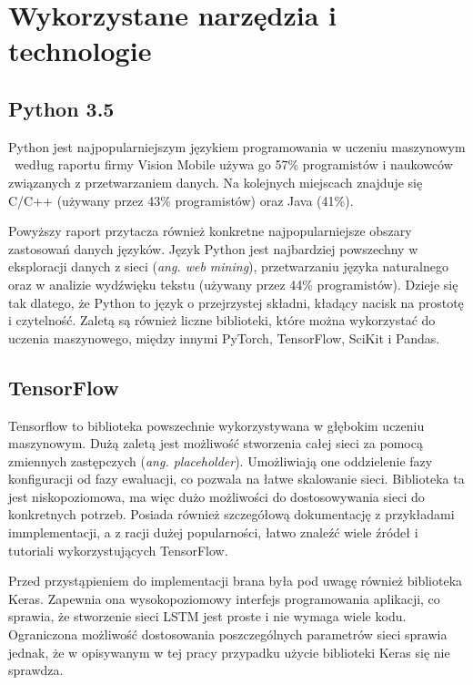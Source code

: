 \chapter{Wykorzystane narzędzia i technologie}
\label{cha:technologie}

\section{Python 3.5}
\label{sec:python}
Python jest najpopularniejszym językiem programowania w uczeniu maszynowym \textendash \ według raportu firmy Vision Mobile\cite{visionmobile} używa go 57\% programistów i naukowców związanych z przetwarzaniem danych. Na kolejnych miejscach znajduje się C/C++ (używany przez 43\% programistów) oraz Java (41\%). 

Powyższy raport przytacza również konkretne najpopularniejsze obszary zastosowań danych języków. Język Python jest najbardziej powszechny w eksploracji danych z sieci (\textit{ang. web mining}), przetwarzaniu języka naturalnego oraz w analizie wydźwięku tekstu (używany przez 44\% programistów). Dzieje się tak dlatego, że Python to język o przejrzystej składni, kładący nacisk na prostotę i czytelność\cite{python}. Zaletą są również liczne biblioteki, które można wykorzystać do uczenia maszynowego, między innymi PyTorch, TensorFlow, SciKit i Pandas.

\section{TensorFlow}
\label{sec:tensorflow}

Tensorflow to biblioteka powszechnie wykorzystywana w głębokim uczeniu maszynowym. Dużą zaletą jest możliwość stworzenia całej sieci za pomocą zmiennych zastępczych (\textit{ang. placeholder}). Umożliwiają one oddzielenie fazy konfiguracji od fazy ewaluacji, co pozwala na łatwe skalowanie sieci. Biblioteka ta jest niskopoziomowa, ma więc dużo możliwości do dostosowywania sieci do konkretnych potrzeb. 
Posiada również szczegółową dokumentację z przykładami immplementacji\cite{tensorflow}, a z racji dużej popularności, łatwo znaleźć wiele źródeł i tutoriali wykorzystujących TensorFlow.

Przed przystąpieniem do implementacji brana była pod uwagę również biblioteka Keras. Zapewnia ona wysokopoziomowy interfejs programowania aplikacji, co sprawia, że stworzenie sieci LSTM jest proste i nie wymaga wiele kodu. Ograniczona możliwość dostosowania poszczególnych parametrów sieci sprawia jednak, że w opisywanym w tej pracy przypadku użycie biblioteki Keras się nie sprawdza. 

